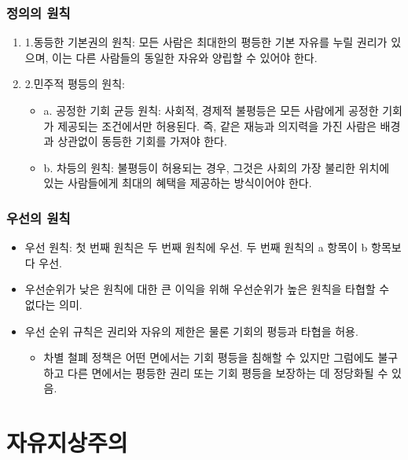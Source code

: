 \documentclass[aspectratio=169,xcolor=dvipsnames,handout]{beamer}
\begin{document}
\begin{frame}[<+->]
\frametitle{정의의 원칙}
    \begin{enumerate}
        \item  1.동등한 기본권의 원칙: 모든 사람은 최대한의 평등한 기본 자유를 누릴 권리가 있으며, 이는 다른 사람들의 동일한 자유와 양립할 수 있어야 한다.
        \item  2.민주적 평등의 원칙: 
        \begin{itemize}
            \item  a. 공정한 기회 균등 원칙: 사회적, 경제적 불평등은 모든 사람에게 공정한 기회가 제공되는 조건에서만 허용된다. 즉, 같은 재능과 의지력을 가진 사람은 배경과 상관없이 동등한 기회를 가져야 한다.
            \item  b. 차등의 원칙: 불평등이 허용되는 경우, 그것은 사회의 가장 불리한 위치에 있는 사람들에게 최대의 혜택을 제공하는 방식이어야 한다.
        \end{itemize}
    \end{enumerate}
\end{frame}

\begin{frame}[<+->]
\frametitle{우선의 원칙}
    \begin{itemize}
        \item 우선 원칙: 첫 번째 원칙은 두 번째 원칙에 우선. 두 번째 원칙의 a 항목이 b 항목보다 우선.
        \item 우선순위가 낮은 원칙에 대한 큰 이익을 위해 우선순위가 높은 원칙을 타협할 수 없다는 의미.
        \item 우선 순위 규칙은 권리와 자유의 제한은 물론 기회의 평등과 타협을 허용.
        \begin{itemize}
            \item 차별 철폐 정책은 어떤 면에서는 기회 평등을 침해할 수 있지만 그럼에도 불구하고 다른 면에서는 평등한 권리 또는 기회 평등을 보장하는 데 정당화될 수 있음.
        \end{itemize}
    \end{itemize}
\end{frame}

\section{자유지상주의}%
\end{document}
